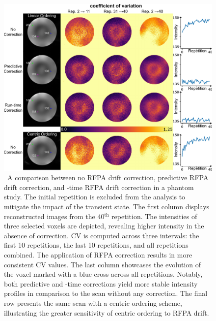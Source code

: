 \begin{figure}[!htbp]
    \centering
    \includegraphics[width=\textwidth]{figures/phantom_drift_result.pdf}
    \caption{\ A comparison between no RFPA drift correction, predictive RFPA drift correction, and -time RFPA drift correction in a phantom study. The initial repetition is excluded from the analysis to mitigate the impact of the transient state. The first column displays reconstructed images from the 40$^\text{th}$ repetition. The intensities of three selected voxels are depicted, revealing higher intensity in the absence of correction. CV is computed across three intervals: the first 10 repetitions, the last 10 repetitions, and all repetitions combined. The application of RFPA correction results in more consistent CV values. The last column showcases the evolution of the voxel marked with a blue cross across all repetitions. Notably, both predictive and -time corrections yield more stable intensity profiles in comparison to the scan without any correction. The final row presents the same scan with a centric ordering scheme, illustrating the greater sensitivity of centric ordering to RFPA drift. }
    \label{fig:phantom_drift_result}
\end{figure}

